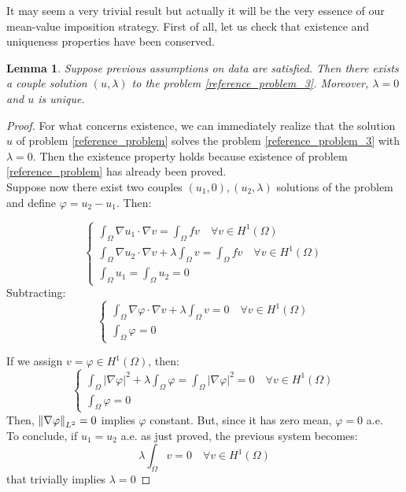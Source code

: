 \documentclass[a4paper,11pt]{article}
\newtheorem{lemma}{Lemma}
\begin{document}
\noindent It may seem a very trivial result but actually it will be the very essence of our mean-value imposition strategy. First of all, let us check that existence and uniqueness properties have been conserved.
\begin{lemma} \label{lemma_lagrange}
	Suppose previous assumptions on data are satisfied. Then there exists a couple solution $(u,\lambda)$ to the problem \ref{reference_problem_3}. Moreover, $\lambda=0$ and $u$ is unique.
\end{lemma}
\begin{proof}
	For what concerns existence, we can immediately realize that the solution $u$ of problem \ref{reference_problem} solves the problem \ref{reference_problem_3} with $\lambda=0$. Then the existence property holds because existence of problem \ref{reference_problem} has already been proved. \\
	
	\noindent Suppose now there exist two couples $(u_1,0), (u_2,\lambda)$ solutions of the problem and define $\varphi=u_2-u_1$. Then:
	
	\begin{equation*}
	\begin{cases}
	\int_{\Omega}\nabla u_1 \cdot \nabla v = \int_{\Omega} fv \quad \forall v \in H^1(\Omega) \\
	\int_{\Omega}\nabla u_2 \cdot \nabla v + \lambda \int_\Omega v = \int_{\Omega} fv \quad \forall v \in H^1(\Omega) \\
	\int_{\Omega}u_1 = \int_{\Omega}u_2 = 0
	\end{cases}
	\end{equation*}
		Subtracting:
	\begin{equation*}
	\begin{cases}
	\int_{\Omega}\nabla \varphi \cdot \nabla v + \lambda \int_\Omega v = 0 \quad \forall v \in H^1(\Omega) \\
	\int_{\Omega}\varphi = 0
	\end{cases}
	\end{equation*}
	
	\noindent If we assign $v=\varphi \in H^1(\Omega)$, then:
	\begin{equation*}
	\begin{cases}
	\int_{\Omega}|\nabla \varphi|^2 + \lambda \int_\Omega \varphi = \int_{\Omega}|\nabla \varphi|^2 = 0 \quad \forall v \in H^1(\Omega) \\
	\int_{\Omega}\varphi = 0
	\end{cases}
	\end{equation*}
	Then, $\norm{\nabla \varphi}_{L^2} = 0 $ implies $\varphi$ constant. But, since it has zero mean,  $\varphi = 0$ a.e.  \\
	To conclude, if $u_1=u_2$ a.e. as just proved, the previous system becomes:
	\begin{equation*}
	\lambda \int_{\Omega}v = 0 \quad \forall v \in H^1(\Omega)
	\end{equation*}
	that trivially implies $\lambda=0$	
\end{proof}
\end{document}
